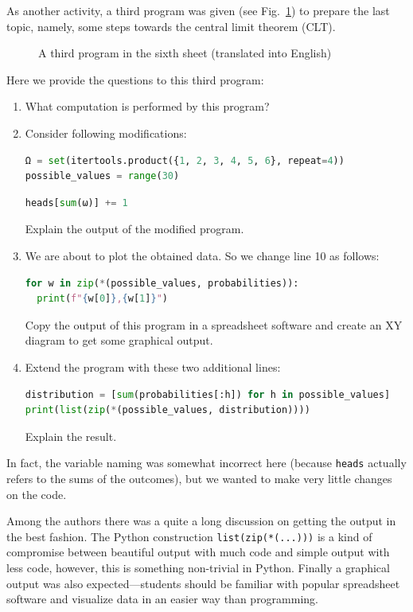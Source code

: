 \documentclass[]{interact}
\theoremstyle{plain}%
\theoremstyle{definition}
\theoremstyle{remark}
\begin{document}
As another activity, a third program was given (see Fig.~\ref{6c.py}) to prepare the last
topic, namely, some steps towards the central limit theorem (CLT).
\begin{figure}

\caption{A third program in the sixth sheet (translated into English)}
\label{6c.py}
\end{figure}
Here we provide the questions to this third program:
\begin{enumerate}
\item What computation is performed by this program?
\item Consider following modifications:
\begin{lstlisting}[language=Python,firstnumber=2]
Ω = set(itertools.product({1, 2, 3, 4, 5, 6}, repeat=4))
possible_values = range(30)
\end{lstlisting}
\begin{lstlisting}[language=Python,firstnumber=8]
  heads[sum(ω)] += 1
\end{lstlisting}
Explain the output of the modified program.
\item We are about to plot the obtained data. So we change line 10 as follows:
\begin{lstlisting}[language=Python,firstnumber=10]
for w in zip(*(possible_values, probabilities)):
  print(f"{w[0]},{w[1]}")
\end{lstlisting}
Copy the output of this program in a spreadsheet software and create an XY diagram
to get some graphical output.
\item Extend the program with these two additional lines:
\begin{lstlisting}[language=Python,firstnumber=12]
distribution = [sum(probabilities[:h]) for h in possible_values]
print(list(zip(*(possible_values, distribution))))
\end{lstlisting}
Explain the result.
\end{enumerate}
In fact, the variable naming was somewhat incorrect here (because \texttt{heads} 
actually refers to the sums of the outcomes), but we wanted to make very little
changes on the code.

Among the authors there was a quite a long discussion on getting the output in
the best fashion. The Python construction \texttt{list(zip(*(...)))} is a kind
of compromise between beautiful output with much code and simple output with less code,
however, this is something non-trivial in Python.
Finally a graphical output was also expected---students should be familiar with
popular spreadsheet software and visualize data in an easier way than programming.
\end{document}
